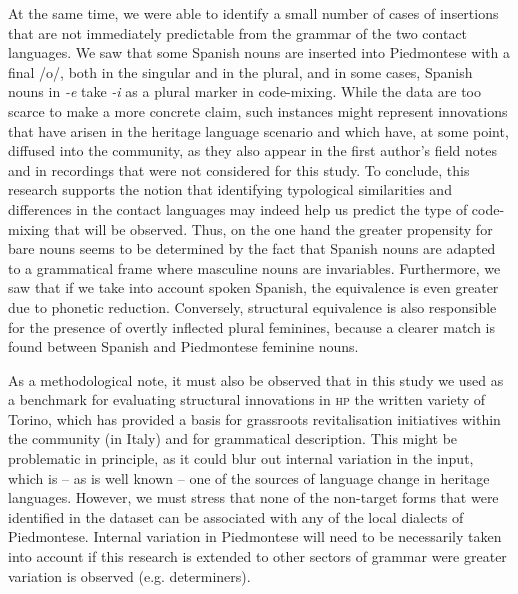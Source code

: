 \documentclass[output=paper]{langscibook}
\begin{document}
At the same time, we were able to identify a small number of cases of insertions that are not immediately predictable from the grammar of the two contact languages. We saw that some Spanish nouns are inserted into Piedmontese with a final /o/, both in the singular and in the plural, and in some cases, Spanish nouns in \textit{{}-e} take \textit{{}-i} as a plural marker in code-mixing. While the data are too scarce to make a more concrete claim, such instances might represent innovations that have arisen in the heritage language scenario and which have, at some point, diffused into the community, as they also appear in the first author’s field notes and in recordings that were not considered for this study. To conclude, this research supports the notion that identifying typological similarities and differences in the contact languages may indeed help us predict the type of code-mixing that will be observed. Thus, on the one hand the greater propensity for bare nouns seems to be determined by the fact that Spanish nouns are adapted to a grammatical frame where masculine nouns are invariables. Furthermore, we saw that if we take into account spoken Spanish, the equivalence is even greater due to phonetic reduction. Conversely, structural equivalence is also responsible for the presence of overtly inflected plural feminines, because a clearer match is found between Spanish and Piedmontese feminine nouns.

As a methodological note, it must also be observed that in this study we used as a benchmark for evaluating structural innovations in \textsc{hp} the written variety of Torino, which has provided a basis for grassroots revitalisation initiatives within the community (in Italy) and for grammatical description. This might be problematic in principle, as it could blur out internal variation in the input, which is – as is well known – one of the sources of language change in heritage languages. However, we must stress that none of the non-target forms that were identified in the dataset can be associated with any of the local dialects of Piedmontese. Internal variation in Piedmontese will need to be necessarily taken into account if this research is extended to other sectors of grammar were greater variation is observed (e.g. determiners).
\end{document}
